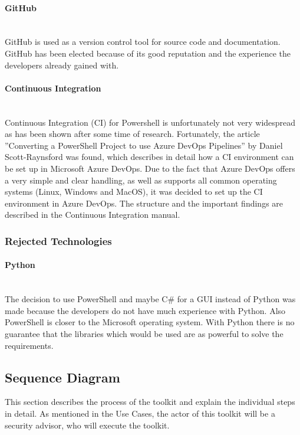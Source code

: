 \paragraph{GitHub}\ \\
GitHub is used as a version control tool for source code and documentation. GitHub has been elected because of its good reputation and the experience the developers already gained with.

\paragraph{Continuous Integration}\ \\
Continuous Integration (CI) for Powershell is unfortunately not very widespread as has been shown after some time of research. Fortunately, the article ''Converting a PowerShell Project to use Azure DevOps Pipelines'' \cite{CI} by Daniel Scott-Raynsford was found, which describes in detail how a CI environment can be set up in Microsoft Azure DevOps. Due to the fact that Azure DevOps offers a very simple and clear handling, as well as supports all common operating systems (Linux, Windows and MacOS), it was decided to set up the CI environment in Azure DevOps. The structure and the important findings are described in the Continuous Integration manual.

\subsubsection{Rejected Technologies}

\paragraph{Python}\ \\
The decision to use PowerShell and maybe C\# for a GUI instead of Python was made because the developers do not have much experience with Python. Also PowerShell is closer to the Microsoft operating system. With Python there is no guarantee that the libraries which would be used are as powerful to solve the requirements.


\clearpage

\subsection{Sequence Diagram}
This section describes the process of the toolkit and explain the individual steps in detail. As mentioned in the Use Cases, the actor of this toolkit will be a security advisor, who will execute the toolkit.

